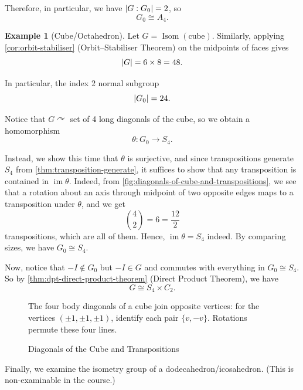 \documentclass{article}
\theoremstyle{definition}
\newtheorem*{example*}{Example}
\theoremstyle{remark}
\DeclarePairedDelimiter{\abs}{\lvert}{\rvert}
\newcommand{\pqty}[1]{\left(#1\right)}
\newcommand{\functiondomain}[3]{#1:#2\to #3}
\newcommand{\isomorphic}{\cong}
\newcommand{\actson}{\curvearrowright}
\newcommand{\img}{\operatorname{im}}
\newcommand{\identityM}{I}
\newcommand{\Isom}{\operatorname{Isom}}
\begin{document}
Therefore, in particular, we have \(\abs{G : G_0} = 2\), so
\[
    G_0 \isomorphic A_4.
\]

\begin{example*}[Cube/Octahedron]
    Let \(G = \Isom\pqty{\text{cube}}\). Similarly, applying \autoref{cor:orbit-stabiliser} (Orbit--Stabiliser Theorem) on the midpoints of faces gives
    \[
        \abs{G} = 6 \times 8 = 48.
    \]

    In particular, the index 2 normal subgroup
    \[
        \abs{G_0} = 24.
    \]

    Notice that \(G \actson\) set of 4 long diagonals of the cube, so we obtain a homomorphism
    \[
        \functiondomain{\theta}{G_0}{S_4}.
    \]

    Instead, we show this time that \(\theta\) is surjective, and since transpositions generate \(S_4\) from \autoref{thm:transposition-generate}, it suffices to show that any transposition is contained in \(\img \theta\). Indeed, from \autoref{fig:diagonals-of-cube-and-transpositions}, we see that a rotation about an axis through midpoint of two opposite edges maps to a transposition under \(\theta\), and we get
    \[
        \binom{4}{2} = 6 = \frac{12}{2}
    \]
    transpositions, which are all of them. Hence, \(\img \theta = S_4\) indeed. By comparing sizes, we have \(G_0 \isomorphic S_4\).

    Now, notice that \(-\identityM \notin G_0\) but \(-\identityM \in G\) and commutes with everything in \(G_0 \isomorphic S_4\). So by \autoref{thm:dpt-direct-product-theorem} (Direct Product Theorem), we have
    \[
        G \isomorphic S_4 \times C_2.
    \]
\end{example*}

\begin{figure}[ht!]
    \centering
    \par The four body diagonals of a cube join opposite vertices: for the vertices $(\pm1,\pm1,\pm1)$, identify each pair $\{v,-v\}$. Rotations permute these four lines.\par

    \caption{Diagonals of the Cube and Transpositions}
    \label{fig:diagonals-of-cube-and-transpositions}
\end{figure}

Finally, we examine the isometry group of a dodecahedron/icosahedron. (This is non-examinable in the course.)
\end{document}
